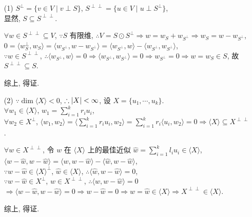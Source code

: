 \documentclass{note}
\begin{document}
\begin{pf}
    \begin{itemize}
        \item[(1)] $S^{\perp}=\{v\in V\mid v\perp S\}$, $S^{\perp\perp}=\{u\in V\mid u\perp S^{\perp}\}$,\\
        显然, $S\subseteq S^{\perp\perp}$.

        $\forall w\in S^{\perp\perp}\subseteq V$, $\because S$ 有限维, $\therefore V=S\odot S^{\perp}\Longrightarrow w=w_S+w_{S^{\perp}}\Longrightarrow w_S=w-w_{S^{\perp}}$,\\
        $0=\langle w_S^{\perp},w_S\rangle=\langle w_{S^{\perp}},w-w_{S^{\perp}}\rangle=\langle w_{S^{\perp}},w\rangle-\langle w_{S^{\perp}},w_{S^{\perp}}\rangle$,\\
        $\because w\in S^{\perp\perp}$, $\therefore\langle w_{S^{\perp}},w\rangle=0\Longrightarrow\langle w_{S^{\perp}},w_{S^{\perp}}\rangle=0\Longrightarrow w_{S^{\perp}}=0\Longrightarrow w=w_S\in S$, 故 $S^{\perp\perp}\subseteq S$.

        综上, 得证.
        \item[(2)] $\because\dim\langle X\rangle<0$, $\therefore\left\lvert X\right\rvert<\infty$, 设 $X=\{u_1,\cdots,u_k\}$.\\
        $\forall w_1\in\langle X\rangle$, $w_1=\sum_{i=1}^kr_iu_i$,\\
        $\forall w_2\in X^{\perp}$, $\langle w_1,w_2\rangle=\langle\sum_{i=1}^kr_iu_i,w_2\rangle=\sum_{i=1}^kr_i\langle u_i,w_2\rangle=0\Longrightarrow\langle X\rangle\subseteq X^{\perp\perp}$.

        $\forall w\in X^{\perp\perp}$, 令 $w$ 在 $\langle X\rangle$ 上的最佳近似 $\hat{w}=\sum_{i=1}^kl_iu_i\in\langle X\rangle$,\\
        $\langle w-\hat{w},w-\hat{w}\rangle=\langle w,w-\hat{w}\rangle-\langle\hat{w},w-\hat{w}\rangle$,\\
        $\because w-\hat{w}\in\langle X\rangle^{\perp}$, $\hat{w}\in\langle X\rangle$, $\therefore\langle\hat{w},w-\hat{w}\rangle=0$,\\
        $\because w-\hat{w}\in X^{\perp}$, $w\in X^{\perp\perp}$, $\therefore\langle w,w-\hat{w}\rangle=0$\\
        $\Longrightarrow\langle w-\hat{w},w-\hat{w}\rangle=0\Longrightarrow w-\hat{w}=0\Longrightarrow w=\hat{w}\in\langle X\rangle\Longrightarrow X^{\perp\perp}\in\langle X\rangle$.

        综上, 得证.
    \end{itemize}
\end{pf}
\end{document}
